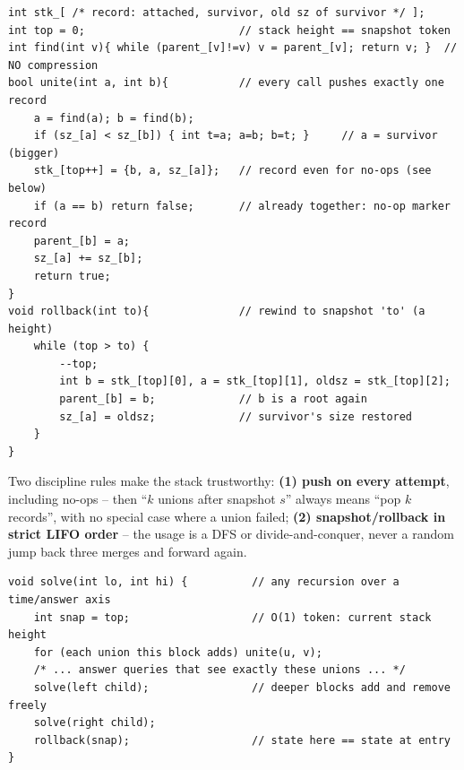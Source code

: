 \begin{lstlisting}[caption={rollback DSU: union by size only, stack of (attached, survivor, survivor's old size)}, label={lst:c28-rollback}]
int stk_[ /* record: attached, survivor, old sz of survivor */ ];
int top = 0;                        // stack height == snapshot token
int find(int v){ while (parent_[v]!=v) v = parent_[v]; return v; }  // NO compression
bool unite(int a, int b){           // every call pushes exactly one record
    a = find(a); b = find(b);
    if (sz_[a] < sz_[b]) { int t=a; a=b; b=t; }     // a = survivor (bigger)
    stk_[top++] = {b, a, sz_[a]};   // record even for no-ops (see below)
    if (a == b) return false;       // already together: no-op marker record
    parent_[b] = a;
    sz_[a] += sz_[b];
    return true;
}
void rollback(int to){              // rewind to snapshot 'to' (a height)
    while (top > to) {
        --top;
        int b = stk_[top][0], a = stk_[top][1], oldsz = stk_[top][2];
        parent_[b] = b;             // b is a root again
        sz_[a] = oldsz;             // survivor's size restored
    }
}
\end{lstlisting}

Two discipline rules make the stack trustworthy:
\textbf{(1) push on every attempt}, including no-ops -- then ``\(k\) unions
after snapshot \(s\)'' always means ``pop \(k\) records'', with no special
case where a union failed; \textbf{(2) snapshot/rollback in strict LIFO
order} -- the usage is a DFS or divide-and-conquer, never a random jump back
three merges and forward again.

\begin{lstlisting}[caption={the snapshot/rollback driver pattern used by secref:c28-offline}, label={lst:c28-rb-driver}]
void solve(int lo, int hi) {          // any recursion over a time/answer axis
    int snap = top;                   // O(1) token: current stack height
    for (each union this block adds) unite(u, v);
    /* ... answer queries that see exactly these unions ... */
    solve(left child);                // deeper blocks add and remove freely
    solve(right child);
    rollback(snap);                   // state here == state at entry
}
\end{lstlisting}

